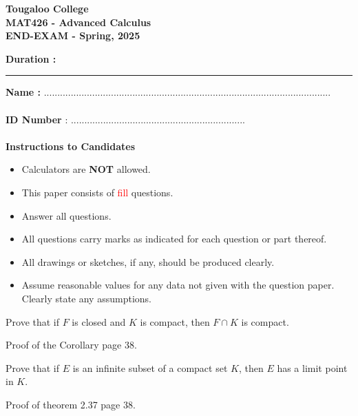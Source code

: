 \documentclass[12pt]{exam}
\newcommand{\paper}[5]{
    \setcounter{page}{1}
    
    \begin{minipage}{\textwidth}
    \Large{\textbf{Tougaloo College}}\\
    \textbf{#2}\\
    \textbf{#5 - #3}\\
    \end{minipage}
    \hfill
        \begin{minipage}{6in}
            \textbf{\hspace{0.25in}Duration : #1 }
        \end{minipage}
        \hfill
        \begin{minipage}{3in}
            \textbf{}
        \end{minipage}
    
    \vspace{0.1in}
    \rule[1ex]{\textwidth}{2pt}
    }
\begin{document}
\paper{}{MAT426 - Advanced Calculus}{Spring, 2025}{}{END-EXAM}

\noindent \textbf{Name :}  ...........................................................................................................\\
\vspace{0.1in}\\
\textbf{ID Number} : .................................................................\\
\vspace{0.2in}\\
\hspace*{0.2in}\textbf{Instructions to Candidates }
\begin{itemize}
    \item Calculators are \textbf{NOT} allowed. 
    \item This paper consists of \textcolor{red}{fill} questions.
    \item Answer all questions. 
    \item All questions carry marks as indicated for each question or part thereof.
    \item All drawings or sketches, if any, should be produced clearly.
    \item Assume reasonable values for any data not given with the question paper. Clearly state any assumptions.
\end{itemize}

\newpage
\begin{questions}

\question[] Prove that if \(F\) is closed and \(K\) is compact, then \(F \cap K \) is compact. 

\begin{solution}
    Proof of the Corollary page 38. 
\end{solution}

\question[] Prove that if \(E\) is an infinite subset of a compact set \(K\), then \(E\) has a limit point in \(K\). 

\begin{solution}
    Proof of theorem 2.37 page 38. 
\end{solution}



\end{questions}
\end{document}
